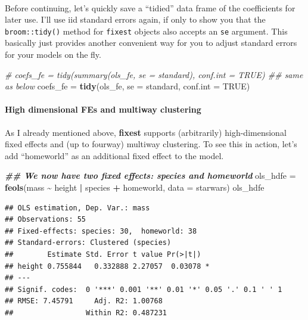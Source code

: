 \documentclass[
]{article}
\newenvironment{Shaded}{\begin{snugshade}}{\end{snugshade}}
\newcommand{\AttributeTok}[1]{\textcolor[rgb]{0.13,0.29,0.53}{#1}}
\newcommand{\CommentTok}[1]{\textcolor[rgb]{0.56,0.35,0.01}{\textit{#1}}}
\newcommand{\ConstantTok}[1]{\textcolor[rgb]{0.56,0.35,0.01}{#1}}
\newcommand{\DocumentationTok}[1]{\textcolor[rgb]{0.56,0.35,0.01}{\textbf{\textit{#1}}}}
\newcommand{\FunctionTok}[1]{\textcolor[rgb]{0.13,0.29,0.53}{\textbf{#1}}}
\newcommand{\NormalTok}[1]{#1}
\newcommand{\OtherTok}[1]{\textcolor[rgb]{0.56,0.35,0.01}{#1}}
\newcommand{\SpecialCharTok}[1]{\textcolor[rgb]{0.81,0.36,0.00}{\textbf{#1}}}
\newcommand{\StringTok}[1]{\textcolor[rgb]{0.31,0.60,0.02}{#1}}
\begin{document}
~

Before continuing, let's quickly save a ``tidied'' data frame of the
coefficients for later use. I'll use iid standard errors again, if only
to show you that the \texttt{broom::tidy()} method for \texttt{fixest}
objects also accepts an \texttt{se} argument. This basically just
provides another convenient way for you to adjust standard errors for
your models on the fly.

\begin{Shaded}
\begin{Highlighting}[]
\CommentTok{\# coefs\_fe = tidy(summary(ols\_fe, se = \textquotesingle{}standard\textquotesingle{}), conf.int = TRUE) \#\# same as below}
\NormalTok{coefs\_fe }\OtherTok{=} \FunctionTok{tidy}\NormalTok{(ols\_fe, }\AttributeTok{se =} \StringTok{\textquotesingle{}standard\textquotesingle{}}\NormalTok{, }\AttributeTok{conf.int =} \ConstantTok{TRUE}\NormalTok{)}
\end{Highlighting}
\end{Shaded}

\hypertarget{high-dimensional-fes-and-multiway-clustering}{%
\paragraph{High dimensional FEs and multiway
clustering}\label{high-dimensional-fes-and-multiway-clustering}}

As I already mentioned above, \textbf{fixest} supports (arbitrarily)
high-dimensional fixed effects and (up to fourway) multiway clustering.
To see this in action, let's add ``homeworld'' as an additional fixed
effect to the model.

\begin{Shaded}
\begin{Highlighting}[]
\DocumentationTok{\#\# We now have two fixed effects: species and homeworld}
\NormalTok{ols\_hdfe }\OtherTok{=} \FunctionTok{feols}\NormalTok{(mass }\SpecialCharTok{\textasciitilde{}}\NormalTok{ height }\SpecialCharTok{|}\NormalTok{ species }\SpecialCharTok{+}\NormalTok{ homeworld, }\AttributeTok{data =}\NormalTok{ starwars)}
\NormalTok{ols\_hdfe}
\end{Highlighting}
\end{Shaded}

\begin{verbatim}
## OLS estimation, Dep. Var.: mass
## Observations: 55 
## Fixed-effects: species: 30,  homeworld: 38
## Standard-errors: Clustered (species) 
##        Estimate Std. Error t value Pr(>|t|)    
## height 0.755844   0.332888 2.27057  0.03078 *  
## ---
## Signif. codes:  0 '***' 0.001 '**' 0.01 '*' 0.05 '.' 0.1 ' ' 1
## RMSE: 7.45791     Adj. R2: 1.00768 
##                 Within R2: 0.487231
\end{verbatim}
\end{document}
